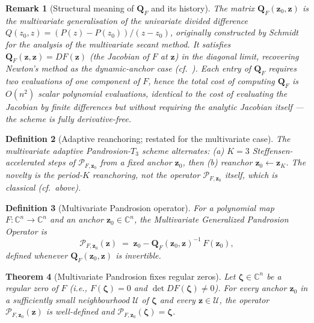 \documentclass[11pt,a4paper]{article}
\newtheorem{theorem}{Theorem}[section]
\newtheorem{remark}[theorem]{Remark}
\newtheorem{definition}[theorem]{Definition}
\begin{document}
\begin{remark}[Structural meaning of $\mathbf{Q}_F$ and its history]
The matrix $\mathbf{Q}_F(\mathbf{z}_0, \mathbf{z})$ is the multivariate generalisation of the univariate divided difference $Q(z_0, z) = (P(z) - P(z_0))/(z - z_0)$, originally constructed by Schmidt~\cite{schmidt1963} for the analysis of the multivariate secant method. It satisfies $\mathbf{Q}_F(\mathbf{z}, \mathbf{z}) = DF(\mathbf{z})$ (the Jacobian of $F$ at $\mathbf{z}$) in the diagonal limit, recovering Newton's method as the dynamic-anchor case (cf.\ \cite[Theorem 11.2.5]{ortegarheinboldt1970}). Each entry of $\mathbf{Q}_F$ requires \emph{two evaluations of one component of $F$}, hence the total cost of computing $\mathbf{Q}_F$ is $O(n^2)$ scalar polynomial evaluations, identical to the cost of evaluating the Jacobian by finite differences but \emph{without requiring the analytic Jacobian itself} --- the scheme is fully derivative-free.
\end{remark}

\begin{definition}[Adaptive reanchoring; restated for the multivariate case]\label{def:adaptive-pandrosion-recall}
The multivariate adaptive Pandrosion-$T_3$ scheme alternates: (a) $K = 3$ Steffensen-accelerated steps of $\mathcal{P}_{F, \mathbf{z}_0}$ from a fixed anchor $\mathbf{z}_0$, then (b) reanchor $\mathbf{z}_0 \leftarrow \mathbf{z}_K$. The novelty is the period-$K$ reanchoring, not the operator $\mathcal{P}_{F, \mathbf{z}_0}$ itself, which is classical (cf.\ above).
\end{definition}

\begin{definition}[Multivariate Pandrosion operator]\label{def:multivariate-P}
For a polynomial map $F: \mathbb{C}^n \to \mathbb{C}^n$ and an anchor $\mathbf{z}_0 \in \mathbb{C}^n$, the \emph{Multivariate Generalized Pandrosion Operator} is
\begin{equation}
\boxed{\mathcal{P}_{F, \mathbf{z}_0}(\mathbf{z}) \;=\; \mathbf{z}_0 - \mathbf{Q}_F(\mathbf{z}_0, \mathbf{z})^{-1}\, F(\mathbf{z}_0),}
\label{eq:multivariate-pandrosion}
\end{equation}
defined whenever $\mathbf{Q}_F(\mathbf{z}_0, \mathbf{z})$ is invertible.
\end{definition}

\begin{theorem}[Multivariate Pandrosion fixes regular zeros]
Let $\boldsymbol\zeta \in \mathbb{C}^n$ be a regular zero of $F$ (i.e., $F(\boldsymbol\zeta) = 0$ and $\det DF(\boldsymbol\zeta) \ne 0$). For every anchor $\mathbf{z}_0$ in a sufficiently small neighbourhood $\mathcal{U}$ of $\boldsymbol\zeta$ and every $\mathbf{z} \in \mathcal{U}$, the operator $\mathcal{P}_{F, \mathbf{z}_0}(\mathbf{z})$ is well-defined and $\mathcal{P}_{F, \mathbf{z}_0}(\boldsymbol\zeta) = \boldsymbol\zeta$.
\end{theorem}
\end{document}

